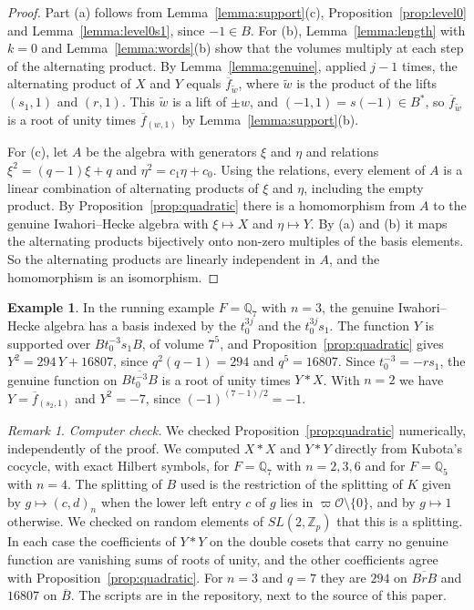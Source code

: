 \documentclass[12pt,letterpaper]{amsart}
\numberwithin{equation}{section}
\theoremstyle{definition}
\newtheorem{example}[theorem]{Example}
\theoremstyle{remark}
\newtheorem{vremark}{Remark}
\newcommand{\cO}{\mathcal{O}}
\newcommand{\fbar}{\overline{f}}
\begin{document}
\begin{proof}
Part (a) follows from Lemma~\ref{lemma:support}(c),
Proposition~\ref{prop:level0} and Lemma~\ref{lemma:level0s1}, since
$-1\in B$. For (b), Lemma~\ref{lemma:length} with $k=0$ and
Lemma~\ref{lemma:words}(b) show that the volumes multiply at each step
of the alternating product. By Lemma~\ref{lemma:genuine}, applied $j-1$
times, the alternating product of $X$ and $Y$ equals
$\fbar_{\tilde w}$, where $\tilde w$ is the product of the lifts
$(s_1,1)$ and $(r,1)$. This $\tilde w$ is a lift of $\pm w$, and
$(-1,1)=s(-1)\in B^*$, so $\fbar_{\tilde w}$ is a root of unity times
$\fbar_{(w,1)}$ by Lemma~\ref{lemma:support}(b).

For (c), let $A$ be the algebra with generators $\xi$ and $\eta$ and
relations $\xi^2=(q-1)\xi+q$ and $\eta^2=c_1\eta+c_0$. Using the
relations, every element of $A$ is a linear combination of alternating
products of $\xi$ and $\eta$, including the empty product. By
Proposition~\ref{prop:quadratic} there is a homomorphism from $A$ to
the genuine Iwahori--Hecke algebra with $\xi\mapsto X$ and
$\eta\mapsto Y$. By (a) and (b) it maps the alternating products
bijectively onto non-zero multiples of the basis elements. So the
alternating products are linearly independent in $A$, and the
homomorphism is an isomorphism.
\end{proof}

\begin{example}
\label{ex:presentation}
In the running example $F=\mathbb{Q}_7$ with $n=3$, the genuine
Iwahori--Hecke algebra has a basis indexed by the $t_0^{3j}$ and the
$t_0^{3j}s_1$. The function $Y$ is supported over $Bt_0^{-3}s_1B$, of
volume $7^5$, and Proposition~\ref{prop:quadratic} gives
$Y^2=294\,Y+16807$, since $q^2(q-1)=294$ and $q^5=16807$. Since
$t_0^{-3}=-rs_1$, the genuine function on $\overline{Bt_0^{-3}B}$ is a
root of unity times $Y*X$. With $n=2$ we have $Y=\fbar_{(s_2,1)}$ and
$Y^2=-7$, since $(-1)^{(7-1)/2}=-1$.
\end{example}

\begin{vremark}
\label{vrem:computer}
\emph{Computer check.} We checked Proposition~\ref{prop:quadratic}
numerically, independently of the proof. We computed $X*X$ and $Y*Y$
directly from Kubota's cocycle, with exact Hilbert symbols, for
$F=\mathbb{Q}_7$ with $n=2,3,6$ and for $F=\mathbb{Q}_5$ with $n=4$.
The splitting of $B$ used is the restriction of the splitting of $K$
given by $g\mapsto(c,d)_n$ when the lower left entry $c$ of $g$ lies in
$\varpi\cO\setminus\{0\}$, and by $g\mapsto 1$ otherwise. We checked on
random elements of $SL(2,\mathbb{Z}_p)$ that this is a splitting. In
each case the coefficients of $Y*Y$ on the double cosets that carry no
genuine function are vanishing sums of roots of unity, and the other
coefficients agree with Proposition~\ref{prop:quadratic}. For $n=3$ and
$q=7$ they are $294$ on $\overline{BrB}$ and $16807$ on
$\overline{B}$. The scripts are in the repository, next to the source
of this paper.
\end{vremark}
\end{document}
